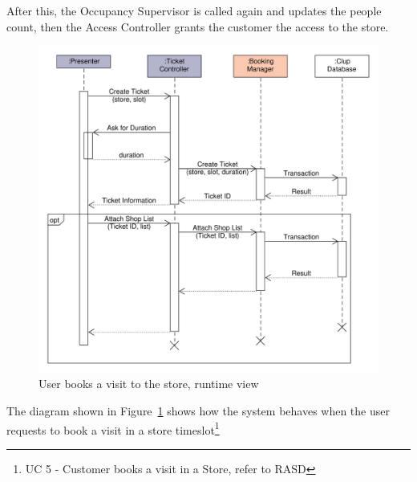 After this, the Occupancy Supervisor is called again and updates the people count, then the Access Controller grants the customer the access to the store.
\begin{figure}[H]
    \includegraphics[width=\textwidth]{Images/UML_user_book_visit.pdf}
    \caption{\label{fig:UML_user_book_visit}User books a visit to the store, runtime view}
\end{figure}
The diagram shown in Figure~\ref{fig:UML_user_book_visit} shows how the system behaves when the user requests to book a visit in a store timeslot\footnote{UC 5 - Customer books a visit in a Store, refer to RASD}

